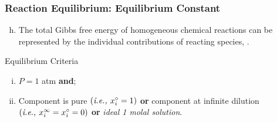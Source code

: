 \documentclass[10pt,compress,unknownkeysallowed]{beamer}
\begin{document}
\begin{frame}
  \frametitle{Reaction Equilibrium: Equilibrium Constant}
      \begin{enumerate}[a)]\setcounter{enumi}{7}
        \item<1-> The total Gibbs free energy of homogeneous chemical reactions can be represented by the individual contributions of reacting species,
            .
      \end{enumerate}

      \begin{block} {\begin{center}Equilibrium Criteria\end{center}}
                  \begin{enumerate}[i)]
                      \item<3-> $P=1$ atm {\bf and};
                      \item<3-> Component is pure $\left(\text{{\it i.e., }} x_{i}^{\circ}=1\right)$ {\bf or } component at infinite dilution $\left(\text{{\it i.e., }} x_{i}^{\infty}=x_{i}^{\circ}=0\right)$ {\bf or} {\it ideal 1 molal solution}.
                   \end{enumerate}
      \end{block}

\end{frame}
\end{document}
